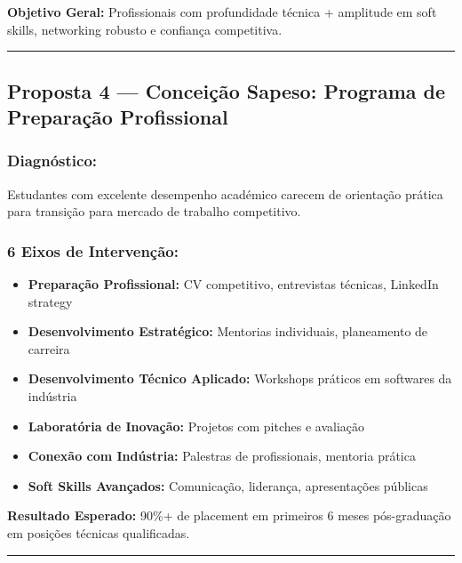 \documentclass[12pt,a4paper]{article}
\begin{document}
\textbf{Objetivo Geral:} Profissionais com profundidade técnica + amplitude em soft skills, networking robusto e confiança competitiva.

\textcolor{spe-secondary}{\hspace{0.5cm}\rule{0.4\linewidth}{0.8pt}}

\subsection{Proposta 4 — Conceição Sapeso: Programa de Preparação Profissional}

\subsubsection*{Diagnóstico:}
Estudantes com excelente desempenho académico carecem de orientação prática para transição para mercado de trabalho competitivo.

\subsubsection*{6 Eixos de Intervenção:}

\begin{itemize}[itemsep=0.2cm]
    \item \textbf{Preparação Profissional:} CV competitivo, entrevistas técnicas, LinkedIn strategy
    
    \item \textbf{Desenvolvimento Estratégico:} Mentorias individuais, planeamento de carreira
    
    \item \textbf{Desenvolvimento Técnico Aplicado:} Workshops práticos em softwares da indústria
    
    \item \textbf{Laboratória de Inovação:} Projetos com pitches e avaliação
    
    \item \textbf{Conexão com Indústria:} Palestras de profissionais, mentoria prática
    
    \item \textbf{Soft Skills Avançados:} Comunicação, liderança, apresentações públicas
\end{itemize}

\textbf{Resultado Esperado:} 90\%+ de placement em primeiros 6 meses pós-graduação em posições técnicas qualificadas.

\textcolor{spe-secondary}{\hspace{0.5cm}\rule{0.4\linewidth}{0.8pt}}
\end{document}
